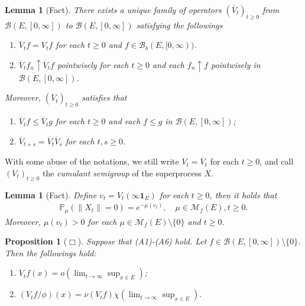 \documentclass[12pt,a4paper]{amsart}
\numberwithin{equation}{section}
\theoremstyle{plain}
\newtheorem{lem}[thm]{Lemma}
\newtheorem{prop}[thm]{Proposition}
\theoremstyle{definition}
\theoremstyle{remark}
\begin{document}
\begin{lem}[Fact] \label{::YC}
  There exists a unique family of operators $(\overline V_t)_{t \geq 0}$ from $\mathcal B(E, [0,\infty])$ to $\mathcal B(E, [0,\infty])$ satisfying the followings
  \begin{enumerate}[label=(\alph*)]
  \item \label{::YCa} $\overline V_tf = V_tf$ for each $t\geq 0$ and $f \in \mathcal B_b(E, [0,\infty))$.
  \item \label{::YCb} $\overline V_tf_n \uparrow \overline V_tf$ pointwisely for each $t\geq 0$ and each $f_n \uparrow f$ pointwisely in $\mathcal B(E, [0,\infty])$.
  \end{enumerate}
  Moreover, $(\overline V_t)_{t\geq 0}$ satisfies that
  \begin{enumerate}
  \item \label{::YC1} $\overline V_tf \leq \overline V_tg$ for each $t\geq 0$ and each $f\leq g$ in $\mathcal B(E,[0,\infty])$;
  \item \label{::YC2} $\overline V_{t+s} = \overline V_t \overline V_s$ for each $t, s\geq 0$.
  \end{enumerate}
\end{lem}

With some abuse of the notations, we still write $V_t = \overline V_t$ for each $t\geq 0$, and call $(V_t)_{t\geq 0}$ the \emph{cumulant semigroup} of the superprocess $X$.

\begin{lem}[Fact] \label{::YE}
  Define $v_t = V_t(\infty\mathbf 1_E)$ for each $t\geq 0$, then it holds that 
  \begin{align}
    \mathbb P_\mu (\|X_t\| = 0) 
    = e^{- \mu (v_t)}
    , \quad \mu \in \mathcal M_f(E), t\geq 0.
  \end{align}      
  Moreover, $\mu(v_t) > 0$ for each $\mu \in \mathcal M_f(E)\setminus\{0\}$ and $t \geq 0$.
\end{lem}

\begin{prop}[$\Box$] \label{::YV} Suppose that (A1)-(A6) hold. Let $f\in \mathcal B(E, [0,\infty])\setminus \{0\}$. Then the followings hold:
  \begin{enumerate}
  \item \label{::YV1} $  V_tf(x) = o(\lim_{t\to \infty} \sup_{x\in E})$;
  \item \label{::YV3}$(V_tf/\phi)(x) = \nu (V_tf) \chi(\lim_{t\to \infty} \sup_{x\in E}).$
  \end{enumerate}
\end{prop}
\end{document}
